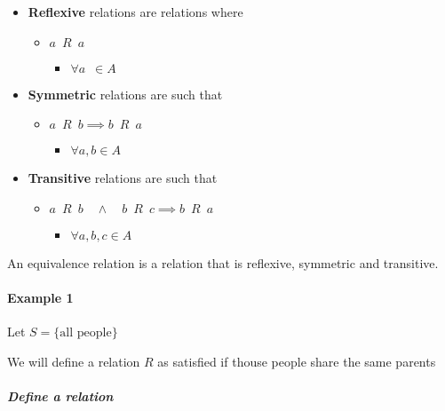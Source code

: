 \documentclass[
]{article}
\begin{document}
\begin{itemize}
\item
  \textbf{Reflexive} relations are relations where

  \begin{itemize}
  \item
    \(a \enspace R \enspace a\)

    \begin{itemize}
    \item
      \(\forall a \enspace \in A\)
    \end{itemize}
  \end{itemize}
\item
  \textbf{Symmetric} relations are such that

  \begin{itemize}
  \item
    \(a \enspace R \enspace b \implies b \enspace R \enspace a\)

    \begin{itemize}
    \item
      \(\forall a, b \in A\)
    \end{itemize}
  \end{itemize}
\item
  \textbf{Transitive} relations are such that

  \begin{itemize}
  \item
    \(a \enspace R \enspace b \quad \wedge \quad  b \enspace R \enspace c \implies  b \enspace R \enspace a\)

    \begin{itemize}
    \item
      \(\forall a,b,c\in A\)
    \end{itemize}
  \end{itemize}
\end{itemize}

An equivalence relation is a relation that is reflexive, symmetric and
transitive.

\hypertarget{header-n350}{%
\paragraph{Example 1}\label{header-n350}}

Let \(S = \{\text{all people}\}\)

We will define a relation \(R\) as satisfied if thouse people share the
same parents

\hypertarget{header-n353}{%
\subparagraph{Define a relation}\label{header-n353}}
\end{document}
